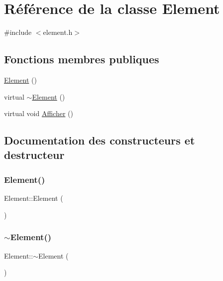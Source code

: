 \hypertarget{class_element}{}\section{Référence de la classe Element}
\label{class_element}


{\ttfamily \#include $<$element.\+h$>$}

\subsection*{Fonctions membres publiques}
\begin{DoxyCompactItemize}
\item 
\hyperlink{class_element_ab0d0e20be9a36ae676202db753faeec9}{Element} ()
\item 
virtual \hyperlink{class_element_a13d54ba9c08b6bec651402f1c2bb002c}{$\sim$\+Element} ()
\item 
virtual void \hyperlink{class_element_a14a6e1d1736f739908fe0a6a24089987}{Afficher} ()
\end{DoxyCompactItemize}


\subsection{Documentation des constructeurs et destructeur}
\mbox{\label{class_element_ab0d0e20be9a36ae676202db753faeec9}} 
\subsubsection{\texorpdfstring{Element()}{Element()}}
{\footnotesize\ttfamily Element\+::\+Element (\begin{DoxyParamCaption}{ }\end{DoxyParamCaption})}

\mbox{\label{class_element_a13d54ba9c08b6bec651402f1c2bb002c}} 
\subsubsection{\texorpdfstring{$\sim$\+Element()}{~Element()}}
{\footnotesize\ttfamily Element\+::$\sim$\+Element (\begin{DoxyParamCaption}{ }\end{DoxyParamCaption})\hspace{0.3cm}{\ttfamily [virtual]}}



